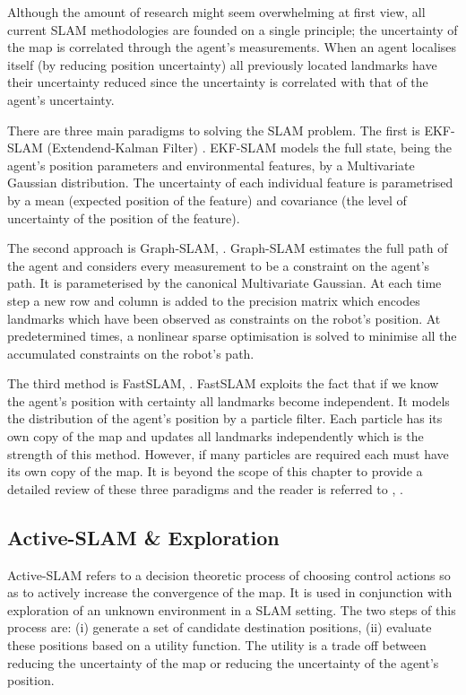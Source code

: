 
Although the amount of research might seem overwhelming at first view, all current SLAM methodologies are founded on a single principle; 
the uncertainty of the map is correlated through the agent's measurements. When an agent localises itself (by reducing position uncertainty)
all previously located landmarks have their uncertainty reduced since the uncertainty is correlated with that of the agent's uncertainty.


There are three main paradigms to solving the SLAM problem. The first is EKF-SLAM (Extendend-Kalman Filter) \cite{SLAM_part1}.
EKF-SLAM models the full state, being the agent's position parameters and environmental features, by a Multivariate Gaussian distribution. 
The uncertainty of each individual feature is parametrised by a mean (expected position of the feature) and covariance 
(the level of uncertainty of the position of the feature).

The second approach is Graph-SLAM, \cite{TutGraphSLAM}. Graph-SLAM estimates the full path of the agent and considers every measurement to 
be a constraint on the agent's path. It is parameterised by the canonical Multivariate Gaussian. At each time step a new row and column 
is added to the precision matrix which encodes landmarks which have been observed as constraints on the robot's position.
At predetermined times, a nonlinear sparse optimisation is solved to minimise all the accumulated constraints on the robot's path.

The third method is FastSLAM, \cite{FastSLAM}. FastSLAM exploits the fact that if we know the agent's position with 
certainty all landmarks become independent. It models the distribution of the agent's position by a particle filter. Each particle
has its own copy of the map and updates all landmarks independently which is the strength of this method. 
However, if many particles are required each must have its own copy of the map. 
It is beyond the scope of this chapter to provide a detailed review of these  three paradigms and the reader is referred 
to \cite{Thrun_Burgard_Fox_2005}, \cite{SLAM_HBR}.

\subsection{Active-SLAM \& Exploration}

Active-SLAM refers to a decision theoretic process of choosing control actions so as to actively 
increase the convergence of the map. It is used in conjunction with exploration of an unknown environment
in a SLAM setting. The two steps of this process are: (i) generate a set of 
candidate destination positions, (ii) evaluate these positions based on a utility function. The utility  
is a trade off between reducing the uncertainty of the map or reducing the uncertainty
of the agent's position.

